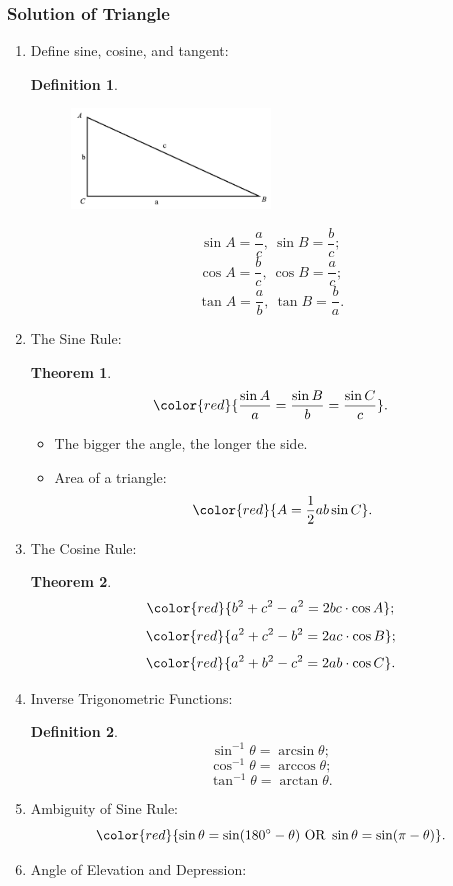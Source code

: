 \documentclass[12pt, a4paper]{article}
\newtheorem{theorem}{Theorem}[subsection]
\newtheorem{definition}{Definition}[subsection]
\begin{document}
\subsubsection{Solution of Triangle}
\begin{enumerate}
  \item Define sine, cosine, and tangent: 
  \begin{definition}
    \begin{figure}[H]
      \centering
      \includegraphics[width=0.5\textwidth]{Fig.3.19.jpg}
    \end{figure}
    $$\sin A=\frac{a}{c},\ \sin B=\frac{b}{c};$$
    $$\cos A=\frac{b}{c},\ \cos B=\frac{a}{c};$$
    $$\tan A=\frac{a}{b},\ \tan B=\frac{b}{a}.$$
  \end{definition}
  \item The Sine Rule: 
  \begin{theorem}
    $${\color{red}{\frac{\sin A}{a}=\frac{\sin B}{b}=\frac{\sin C}{c}}}.$$
  \end{theorem}
  \begin{itemize}
    \item The bigger the angle, the longer the side. 
    \item Area of a triangle: $${\color{red}{A=\frac{1}{2}ab\sin C}}.$$
  \end{itemize}
  \item The Cosine Rule: 
  \begin{theorem}
    $${\color{red}{b^2+c^2-a^2=2bc\cdot\cos A}};$$
    $${\color{red}{a^2+c^2-b^2=2ac\cdot\cos B}};$$
    $${\color{red}{a^2+b^2-c^2=2ab\cdot\cos C}}.$$
  \end{theorem}
  \item Inverse Trigonometric Functions: 
  \begin{definition}
    $$\sin^{-1}\theta=\arcsin\theta;$$
    $$\cos^{-1}\theta=\arccos\theta;$$
    $$\tan^{-1}\theta=\arctan\theta.$$
  \end{definition}
  \item Ambiguity of Sine Rule: 
  $${\color{red}{\sin\theta=\sin(180^\circ-\theta)\text{ OR }\sin\theta=\sin(\pi-\theta)}}.$$
  \item Angle of Elevation and Depression: 

\end{enumerate}
\end{document}
